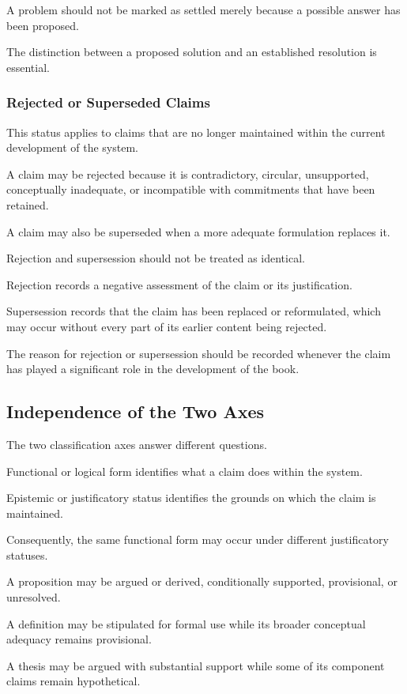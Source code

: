 A problem
should not
be marked
as settled
merely because
a possible
answer has
been proposed.

The distinction
between a proposed
solution and
an established
resolution is
essential.

\subsubsection{Rejected or Superseded Claims}

This status applies
to claims that
are no longer
maintained within
the current
development of
the system.

A claim may
be rejected
because it
is contradictory,
circular, unsupported,
conceptually inadequate,
or incompatible
with commitments
that have been
retained.

A claim may
also be superseded
when a more
adequate formulation
replaces it.

Rejection and
supersession should
not be treated
as identical.

Rejection records
a negative
assessment of
the claim or
its justification.

Supersession records
that the claim
has been replaced
or reformulated,
which may occur
without every
part of its
earlier content
being rejected.

The reason
for rejection
or supersession
should be recorded
whenever the
claim has played
a significant
role in the
development
of the book.

\subsection{Independence of the Two Axes}

The two classification
axes answer different
questions.

Functional or
logical form
identifies what
a claim does
within the
system.

Epistemic or
justificatory status
identifies the
grounds on which
the claim is
maintained.

Consequently,
the same functional
form may occur
under different
justificatory statuses.

A proposition
may be argued
or derived,
conditionally supported,
provisional, or
unresolved.

A definition
may be stipulated
for formal use
while its broader
conceptual adequacy
remains provisional.

A thesis may
be argued
with substantial
support while
some of its
component claims
remain hypothetical.

